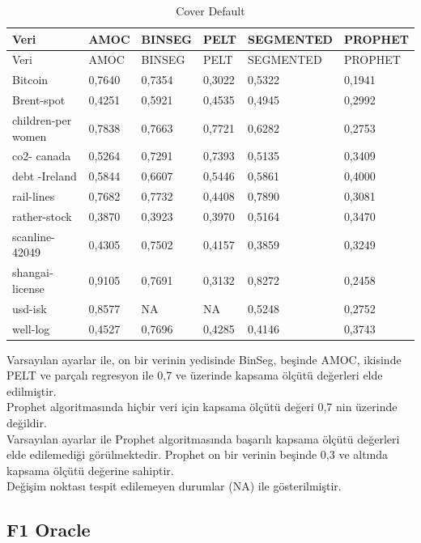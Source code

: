 \documentclass[12pt,twoside]{deuthesis}
\begin{document}
\begin{longtable}[]{@{}llllll@{}}
\caption{\label{tab:nvar4} Cover Default}\tabularnewline
\toprule\noalign{}
Veri & AMOC & BINSEG & PELT & SEGMENTED & PROPHET \\
\midrule\noalign{}
\endfirsthead
\toprule\noalign{}
Veri & AMOC & BINSEG & PELT & SEGMENTED & PROPHET \\
\midrule\noalign{}
\endhead
\bottomrule\noalign{}
\endlastfoot
Bitcoin & 0,7640 & 0,7354 & 0,3022 & 0,5322 & 0,1941 \\
Brent-spot & 0,4251 & 0,5921 & 0,4535 & 0,4945 & 0,2992 \\
children-per women & 0,7838 & 0,7663 & 0,7721 & 0,6282 & 0,2753 \\
co2- canada & 0,5264 & 0,7291 & 0,7393 & 0,5135 & 0,3409 \\
debt -Ireland & 0,5844 & 0,6607 & 0,5446 & 0,5861 & 0,4000 \\
rail-lines & 0,7682 & 0,7732 & 0,4408 & 0,7890 & 0,3081 \\
rather-stock & 0,3870 & 0,3923 & 0,3970 & 0,5164 & 0,3470 \\
scanline-42049 & 0,4305 & 0,7502 & 0,4157 & 0,3859 & 0,3249 \\
shangai-license & 0,9105 & 0,7691 & 0,3132 & 0,8272 & 0,2458 \\
usd-isk & 0,8577 & NA & NA & 0,5248 & 0,2752 \\
well-log & 0,4527 & 0,7696 & 0,4285 & 0,4146 & 0,3743 \\
\end{longtable}

Varsayılan ayarlar ile, on bir verinin yedisinde BinSeg, beşinde AMOC, ikisinde PELT ve parçalı regresyon ile 0,7 ve üzerinde kapsama ölçütü değerleri elde edilmiştir.\\
Prophet algoritmasında hiçbir veri için kapsama ölçütü değeri 0,7 nin üzerinde değildir.\\
Varsayılan ayarlar ile Prophet algoritmasında başarılı kapsama ölçütü değerleri elde edilemediği görülmektedir. Prophet on bir verinin beşinde 0,3 ve altında kapsama ölçütü değerine sahiptir.\\
Değişim noktası tespit edilemeyen durumlar (NA) ile gösterilmiştir.

\hypertarget{f1-oracle}{%
\subsection{F1 Oracle}\label{f1-oracle}}
\end{document}
